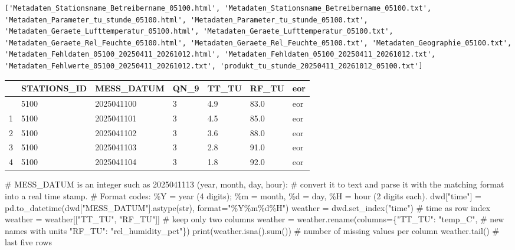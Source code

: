 \documentclass[
  letterpaper,
  DIV=11,
  numbers=noendperiod]{scrreprt}
\newenvironment{Shaded}{\begin{snugshade}}{\end{snugshade}}
\newcommand{\BuiltInTok}[1]{\textcolor[rgb]{0.00,0.23,0.31}{#1}}
\newcommand{\CommentTok}[1]{\textcolor[rgb]{0.37,0.37,0.37}{#1}}
\newcommand{\NormalTok}[1]{\textcolor[rgb]{0.00,0.23,0.31}{#1}}
\newcommand{\OperatorTok}[1]{\textcolor[rgb]{0.37,0.37,0.37}{#1}}
\newcommand{\SpecialCharTok}[1]{\textcolor[rgb]{0.37,0.37,0.37}{#1}}
\newcommand{\StringTok}[1]{\textcolor[rgb]{0.13,0.47,0.30}{#1}}
\begin{document}
\begin{tcolorbox}
\begin{verbatim}
['Metadaten_Stationsname_Betreibername_05100.html', 'Metadaten_Stationsname_Betreibername_05100.txt', 'Metadaten_Parameter_tu_stunde_05100.html', 'Metadaten_Parameter_tu_stunde_05100.txt', 'Metadaten_Geraete_Lufttemperatur_05100.html', 'Metadaten_Geraete_Lufttemperatur_05100.txt', 'Metadaten_Geraete_Rel_Feuchte_05100.html', 'Metadaten_Geraete_Rel_Feuchte_05100.txt', 'Metadaten_Geographie_05100.txt', 'Metadaten_Fehldaten_05100_20250411_20261012.html', 'Metadaten_Fehldaten_05100_20250411_20261012.txt', 'Metadaten_Fehlwerte_05100_20250411_20261012.txt', 'produkt_tu_stunde_20250411_20261012_05100.txt']
\end{verbatim}

\begin{longtable}[]{@{}lllllll@{}}
\toprule\noalign{}
& STATIONS\_ID & MESS\_DATUM & QN\_9 & TT\_TU & RF\_TU & eor \\
\midrule\noalign{}
\endhead
\bottomrule\noalign{}
\endlastfoot
0 & 5100 & 2025041100 & 3 & 4.9 & 83.0 & eor \\
1 & 5100 & 2025041101 & 3 & 4.5 & 85.0 & eor \\
2 & 5100 & 2025041102 & 3 & 3.6 & 88.0 & eor \\
3 & 5100 & 2025041103 & 3 & 2.8 & 91.0 & eor \\
4 & 5100 & 2025041104 & 3 & 1.8 & 92.0 & eor \\
\end{longtable}

\begin{Shaded}
\begin{Highlighting}[]
\CommentTok{\# MESS\_DATUM is an integer such as 2025041113 (year, month, day, hour):}
\CommentTok{\# convert it to text and parse it with the matching format into a real time stamp.}
\CommentTok{\# Format codes: \%Y = year (4 digits); \%m = month, \%d = day, \%H = hour (2 digits each).}
\NormalTok{dwd[}\StringTok{"time"}\NormalTok{] }\OperatorTok{=}\NormalTok{ pd.to\_datetime(dwd[}\StringTok{"MESS\_DATUM"}\NormalTok{].astype(}\BuiltInTok{str}\NormalTok{), }\BuiltInTok{format}\OperatorTok{=}\StringTok{"\%Y\%m}\SpecialCharTok{\%d}\StringTok{\%H"}\NormalTok{)}
\NormalTok{weather }\OperatorTok{=}\NormalTok{ dwd.set\_index(}\StringTok{"time"}\NormalTok{)                  }\CommentTok{\# time as row index}
\NormalTok{weather }\OperatorTok{=}\NormalTok{ weather[[}\StringTok{"TT\_TU"}\NormalTok{, }\StringTok{"RF\_TU"}\NormalTok{]]            }\CommentTok{\# keep only two columns}
\NormalTok{weather }\OperatorTok{=}\NormalTok{ weather.rename(columns}\OperatorTok{=}\NormalTok{\{}\StringTok{"TT\_TU"}\NormalTok{: }\StringTok{"temp\_C"}\NormalTok{,            }\CommentTok{\# new names with units}
                                  \StringTok{"RF\_TU"}\NormalTok{: }\StringTok{"rel\_humidity\_pct"}\NormalTok{\})}
\BuiltInTok{print}\NormalTok{(weather.isna().}\BuiltInTok{sum}\NormalTok{())     }\CommentTok{\# number of missing values per column}
\NormalTok{weather.tail()                  }\CommentTok{\# last five rows}
\end{Highlighting}
\end{Shaded}


\end{tcolorbox}
\end{document}
